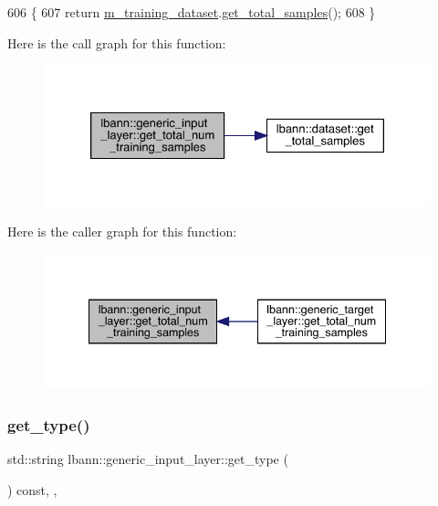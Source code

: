 \begin{DoxyCode}
606                                                        \{
607     \textcolor{keywordflow}{return} \hyperlink{classlbann_1_1generic__input__layer_a23716635b1062bfe57f7fcf75140a63a}{m\_training\_dataset}.\hyperlink{classlbann_1_1dataset_ad314847b347d413162a9d9eab759641f}{get\_total\_samples}();
608   \}
\end{DoxyCode}
Here is the call graph for this function\+:\nopagebreak
\begin{figure}[H]
\begin{center}
\leavevmode
\includegraphics[width=326pt]{classlbann_1_1generic__input__layer_a5fc757d16e26739cd10e5eabafa6a32b_cgraph}
\end{center}
\end{figure}
Here is the caller graph for this function\+:\nopagebreak
\begin{figure}[H]
\begin{center}
\leavevmode
\includegraphics[width=340pt]{classlbann_1_1generic__input__layer_a5fc757d16e26739cd10e5eabafa6a32b_icgraph}
\end{center}
\end{figure}
\mbox{\label{classlbann_1_1generic__input__layer_a5392ea11b5eb98a8040bf5b5deed836a}} 
\subsubsection{\texorpdfstring{get\+\_\+type()}{get\_type()}}
{\footnotesize\ttfamily std\+::string lbann\+::generic\+\_\+input\+\_\+layer\+::get\+\_\+type (\begin{DoxyParamCaption}{ }\end{DoxyParamCaption}) const\hspace{0.3cm}{\ttfamily [inline]}, {\ttfamily [override]}, {\ttfamily [virtual]}}

